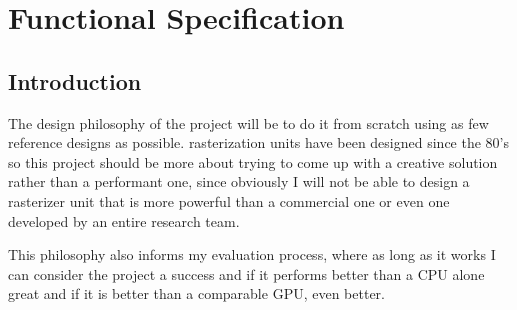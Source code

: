 \chapter{Functional Specification}\label{sec:functionalSpec}
\section{Introduction}
The design philosophy of the project will be to do it from scratch using as few reference designs as possible. rasterization units have been designed since the 80's so this project should be more about trying to come up with a creative solution rather than a performant one, since obviously I will not be able to design a rasterizer unit that is more powerful than  a commercial one or even one developed by an entire research team.

This philosophy also informs my evaluation process, where as long as it works I can consider the project a success and if it performs better than a CPU alone great and if it is better than a comparable GPU, even better.









